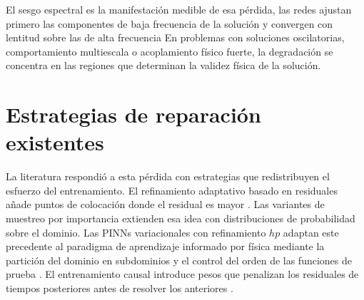 El sesgo espectral es la manifestación medible de esa pérdida, las redes ajustan primero las componentes de baja frecuencia de la solución y convergen con lentitud sobre las de alta frecuencia
En problemas con soluciones oscilatorias, comportamiento multiescala o acoplamiento físico fuerte, la degradación se concentra  en las regiones que determinan la validez física de la solución.

\section{Estrategias de reparación existentes}

La literatura respondió a esta pérdida con estrategias que redistribuyen el esfuerzo del entrenamiento. El refinamiento adaptativo basado en residuales añade puntos de colocación donde el residual es mayor \cite{lu2021deepxde}. Las variantes de muestreo por importancia extienden esa idea con distribuciones de probabilidad sobre el dominio.
Las PINNs variacionales con refinamiento $hp$ adaptan este precedente al paradigma de aprendizaje informado por física mediante la partición del dominio en subdominios y el control del orden de las funciones de prueba \cite{kharazmi2021hpvpinns}. El entrenamiento causal introduce pesos que penalizan los residuales de tiempos posteriores antes de resolver los anteriores \cite{wang2024causal}.

\begin{table}[htbp]
  \centering
  \small
  \caption{Estrategias existentes sobre los cuatro ejes de evaluación del capítulo.}
  \label{tab:rejilla}
\end{table}


